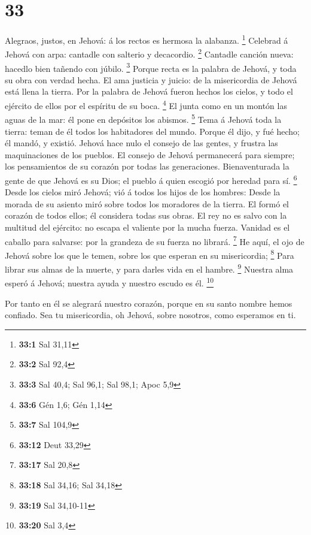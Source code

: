 \hypertarget{section-32}{%
\section{33}\label{section-32}}

 Alegraos, justos, en Jehová: á los rectos es hermosa la
alabanza. \footnote{\textbf{33:1} Sal 31,11}  Celebrad á
Jehová con arpa: cantadle con salterio y decacordio. \footnote{\textbf{33:2}
  Sal 92,4}  Cantadle canción nueva: hacedlo bien tañendo
con júbilo. \footnote{\textbf{33:3} Sal 40,4; Sal 96,1; Sal 98,1; Apoc
  5,9}  Porque recta es la palabra de Jehová, y toda su obra
con verdad hecha.  El ama justicia y juicio: de la
misericordia de Jehová está llena la tierra.  Por la palabra
de Jehová fueron hechos los cielos, y todo el ejército de ellos por el
espíritu de su boca. \footnote{\textbf{33:6} Gén 1,6; Gén 1,14}
 El junta como en un montón las aguas de la mar: él pone en
depósitos los abismos. \footnote{\textbf{33:7} Sal 104,9} 
Tema á Jehová toda la tierra: teman de él todos los habitadores del
mundo.  Porque él dijo, y fué hecho; él mandó, y existió.
 Jehová hace nulo el consejo de las gentes, y frustra las
maquinaciones de los pueblos.  El consejo de Jehová
permanecerá para siempre; los pensamientos de su corazón por todas las
generaciones.  Bienaventurada la gente de que Jehová es su
Dios; el pueblo á quien escogió por heredad para sí. \footnote{\textbf{33:12}
  Deut 33,29}  Desde los cielos miró Jehová; vió á todos
los hijos de los hombres:  Desde la morada de su asiento
miró sobre todos los moradores de la tierra.  El formó el
corazón de todos ellos; él considera todas sus obras.  El
rey no es salvo con la multitud del ejército: no escapa el valiente por
la mucha fuerza.  Vanidad es el caballo para salvarse: por
la grandeza de su fuerza no librará. \footnote{\textbf{33:17} Sal 20,8}
 He aquí, el ojo de Jehová sobre los que le temen, sobre
los que esperan en su misericordia; \footnote{\textbf{33:18} Sal 34,16;
  Sal 34,18}  Para librar sus almas de la muerte, y para
darles vida en el hambre. \footnote{\textbf{33:19} Sal 34,10-11}
 Nuestra alma esperó á Jehová; nuestra ayuda y nuestro
escudo es él. \footnote{\textbf{33:20} Sal 3,4}

 Por tanto en él se alegrará nuestro corazón, porque en su
santo nombre hemos confiado.  Sea tu misericordia, oh
Jehová, sobre nosotros, como esperamos en ti.

